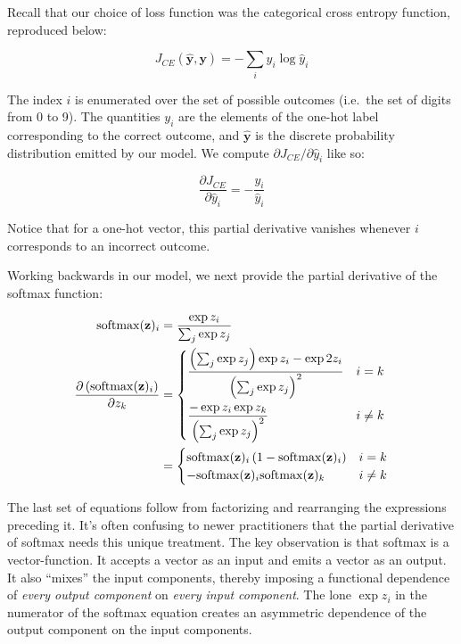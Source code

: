 \documentclass[
]{article}
\begin{document}
Recall that our choice of loss function was the categorical cross
entropy function, reproduced below:

\[J_{CE}(\mathbf{\hat{y}}, \mathbf{y}) = -\sum_{i} y_i \log{\hat{y}_i}\]

The index \(i\) is enumerated over the set of possible outcomes
(i.e.~the set of digits from 0 to 9). The quantities \(y_i\) are the
elements of the one-hot label corresponding to the correct outcome, and
\(\hat{\mathbf{y}}\) is the discrete probability distribution emitted by
our model. We compute \(\partial J_{CE}/\partial \hat{y}_i\) like so:

\[\frac{\partial J_{CE}}{\partial \hat{y}_i} = -\frac{y_i}{\hat{y}_i}\]

Notice that for a one-hot vector, this partial derivative vanishes
whenever \(i\) corresponds to an incorrect outcome.

Working backwards in our model, we next provide the partial derivative
of the softmax function:

\[
\begin{aligned}
\mathrm{softmax}(\mathbf{z})_i &= \frac{\exp{z_i}}{\sum_j \exp{z_j}} \\
\frac{\partial \left(\mathrm{softmax}(\mathbf{z})_i\right)}{\partial z_k} &=
\begin{dcases}
\frac{\left(\sum_j\exp{z_j}\right)\exp{z_i} - \exp{2z_i}}{\left(\sum_j\exp{z_j}\right)^2}& i = k \\
\frac{-\exp{z_i}\exp{z_k}}{\left(\sum_j\exp{z_j}\right)^2}& i \neq k
\end{dcases} \\
&= \begin{cases}
\mathrm{softmax}(\mathbf{z})_i\left(1 - \mathrm{softmax}(\mathbf{z})_i\right) & i = k \\
-\mathrm{softmax}(\mathbf{z})_i \mathrm{softmax}(\mathbf{z})_k & i \neq k
\end{cases}
\end{aligned}
\]

The last set of equations follow from factorizing and rearranging the
expressions preceding it. It's often confusing to newer practitioners
that the partial derivative of softmax needs this unique treatment. The
key observation is that softmax is a vector-function. It accepts a
vector as an input and emits a vector as an output. It also ``mixes''
the input components, thereby imposing a functional dependence of
\emph{every output component} on \emph{every input component}. The lone
\(\exp{z_i}\) in the numerator of the softmax equation creates an
asymmetric dependence of the output component on the input components.
\end{document}
